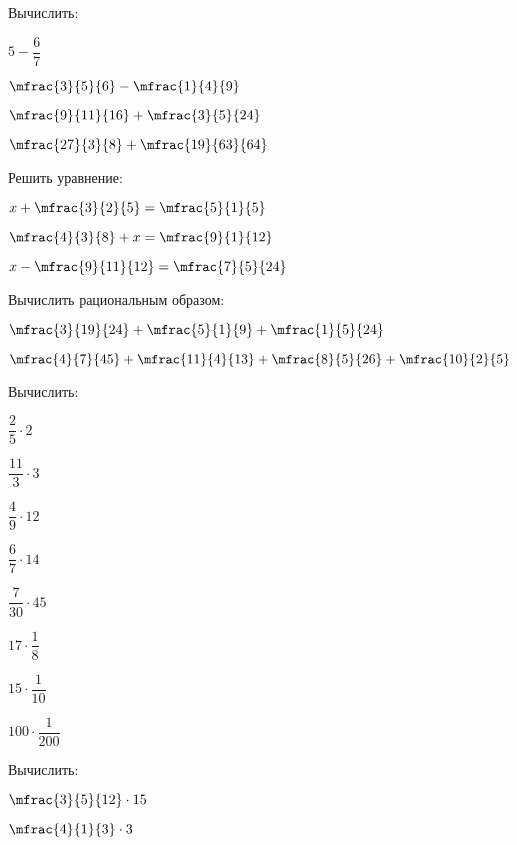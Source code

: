\begin{class}[number=3]
	\begin{listofex}
		\item Вычислить:
		\begin{enumcols}[itemcolumns=4]
			\item \( 5-\dfrac{6}{7} \)
			\item \( \mfrac{3}{5}{6}-\mfrac{1}{4}{9} \)
			\item \( \mfrac{9}{11}{16}+\mfrac{3}{5}{24} \)
			\item \( \mfrac{27}{3}{8}+\mfrac{19}{63}{64} \)
		\end{enumcols}
		\item Решить уравнение:
		\begin{enumcols}[itemcolumns=3]
			\item \( x+\mfrac{3}{2}{5}=\mfrac{5}{1}{5} \)
			\item \( \mfrac{4}{3}{8}+x=\mfrac{9}{1}{12} \)
			\item \( x-\mfrac{9}{11}{12}=\mfrac{7}{5}{24} \)
		\end{enumcols}
		\item Вычислить рациональным образом:
		\begin{enumcols}[itemcolumns=2]
			\item \( \mfrac{3}{19}{24}+\mfrac{5}{1}{9}+\mfrac{1}{5}{24} \)
			\item \( \mfrac{4}{7}{45}+\mfrac{11}{4}{13}+\mfrac{8}{5}{26}+\mfrac{10}{2}{5} \)
		\end{enumcols}
		\item Вычислить:
		\begin{enumcols}[itemcolumns=4]
			\item \( \dfrac{2}{5}\cdot2 \)
			\item \( \dfrac{11}{3}\cdot3 \)
			\item \( \dfrac{4}{9}\cdot12 \)
			\item \( \dfrac{6}{7}\cdot14 \)
			\item \( \dfrac{7}{30}\cdot45 \)
			\item \( 17\cdot\dfrac{1}{8} \)
			\item \( 15\cdot\dfrac{1}{10} \)
			\item \( 100\cdot\dfrac{1}{200} \)
		\end{enumcols}
		\item Вычислить:
		\begin{enumcols}[itemcolumns=4]
			\item \( \mfrac{3}{5}{12}\cdot15 \)
			\item \( \mfrac{4}{1}{3}\cdot3 \)

\end{enumcols}
\end{listofex}
\end{class}
